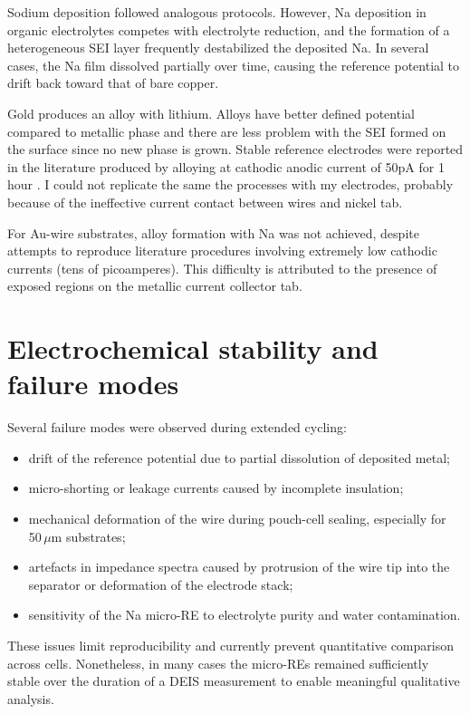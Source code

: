 Sodium deposition followed analogous protocols.  
However, Na deposition in organic electrolytes competes with electrolyte reduction, and the formation of a heterogeneous SEI layer frequently destabilized the deposited Na.  
In several cases, the Na film dissolved partially over time, causing the reference potential to drift back toward that of bare copper.

Gold produces an alloy with lithium. Alloys have better defined potential compared to metallic phase and there are less problem with the SEI formed on the surface since no new phase is grown. Stable reference electrodes were reported in the literature produced by alloying at cathodic anodic current of 50pA for 1 hour \cite{Oehler_2023}. 
I could not replicate the same the processes with my electrodes, probably because of the ineffective current contact between wires and nickel tab.

For Au-wire substrates, alloy formation with Na was not achieved, despite attempts to reproduce literature procedures involving extremely low cathodic currents (tens of picoamperes).  
This difficulty is attributed to the presence of exposed regions on the metallic current collector tab.

\section{Electrochemical stability and failure modes}

Several failure modes were observed during extended cycling:

\begin{itemize}
    \item drift of the reference potential due to partial dissolution of deposited metal;
    \item micro-shorting or leakage currents caused by incomplete insulation;
    \item mechanical deformation of the wire during pouch-cell sealing, especially for 50\,$\mu$m substrates;
    \item artefacts in impedance spectra caused by protrusion of the wire tip into the separator or deformation of the electrode stack;
    \item sensitivity of the Na micro-RE to electrolyte purity and water contamination.
\end{itemize}

These issues limit reproducibility and currently prevent quantitative comparison across cells.  
Nonetheless, in many cases the micro-REs remained sufficiently stable over the duration of a DEIS measurement to enable meaningful qualitative analysis.